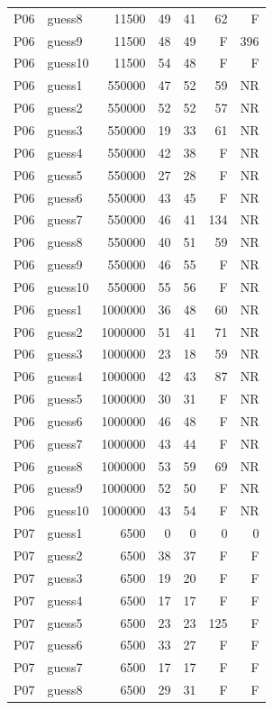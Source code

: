 {\begin{longtable}{llrrrrr}
P06 & guess8 & 11500 & 49 & 41 & 62 & F \\
P06 & guess9 & 11500 & 48 & 49 & F & 396 \\
P06 & guess10 & 11500 & 54 & 48 & F & F \\
P06 & guess1 & 550000 & 47 & 52 & 59 & NR \\
P06 & guess2 & 550000 & 52 & 52 & 57 & NR \\
P06 & guess3 & 550000 & 19 & 33 & 61 & NR \\
P06 & guess4 & 550000 & 42 & 38 & F & NR \\
P06 & guess5 & 550000 & 27 & 28 & F & NR \\
P06 & guess6 & 550000 & 43 & 45 & F & NR \\
P06 & guess7 & 550000 & 46 & 41 & 134 & NR \\
P06 & guess8 & 550000 & 40 & 51 & 59 & NR \\
P06 & guess9 & 550000 & 46 & 55 & F & NR \\
P06 & guess10 & 550000 & 55 & 56 & F & NR \\
P06 & guess1 & 1000000 & 36 & 48 & 60 & NR \\
P06 & guess2 & 1000000 & 51 & 41 & 71 & NR \\
P06 & guess3 & 1000000 & 23 & 18 & 59 & NR \\
P06 & guess4 & 1000000 & 42 & 43 & 87 & NR \\
P06 & guess5 & 1000000 & 30 & 31 & F & NR \\
P06 & guess6 & 1000000 & 46 & 48 & F & NR \\
P06 & guess7 & 1000000 & 43 & 44 & F & NR \\
P06 & guess8 & 1000000 & 53 & 59 & 69 & NR \\
P06 & guess9 & 1000000 & 52 & 50 & F & NR \\
P06 & guess10 & 1000000 & 43 & 54 & F & NR \\
P07 & guess1 & 6500 & 0 & 0 & 0 & 0 \\
P07 & guess2 & 6500 & 38 & 37 & F & F \\
P07 & guess3 & 6500 & 19 & 20 & F & F \\
P07 & guess4 & 6500 & 17 & 17 & F & F \\
P07 & guess5 & 6500 & 23 & 23 & 125 & F \\
P07 & guess6 & 6500 & 33 & 27 & F & F \\
P07 & guess7 & 6500 & 17 & 17 & F & F \\
P07 & guess8 & 6500 & 29 & 31 & F & F \\

\end{longtable}}
